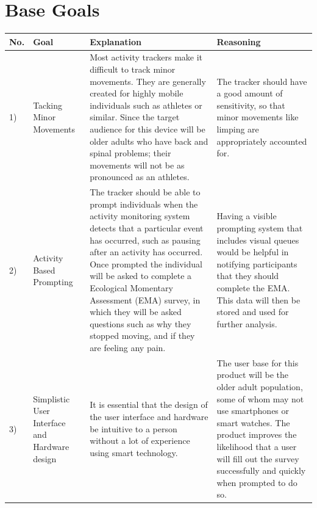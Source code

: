 \documentclass[12pt]{article}
\begin{document}
\section{Base Goals}
\begin{center}
    \begin{longtable}{| m{2em} | m{7em} | m{16em}| m{14em} | }
        \hline
        \textbf{No.} & \textbf{Goal}                                    & \textbf{Explanation} & \textbf{Reasoning}                                                                                                                                                                                                                                                                                                                                                                                                                                                                                                                                                               \\
        \hline
       1) & Tacking Minor Movements                          & Most activity trackers make it difficult to track minor movements.
        They are generally created for highly mobile individuals such as athletes or similar. Since the target audience for this device will be older adults who have back and spinal problems; their movements will not be as pronounced as an athletes. & The tracker should have a good amount of sensitivity, so that minor movements like limping are appropriately accounted for.                                                                                                                                                                                                                                                       \\
        \hline
      2)  & Activity Based Prompting                            & The tracker should be able to prompt individuals when the activity monitoring system detects that a particular event has occurred, such as pausing after an activity has occurred.  Once prompted the individual will be asked to complete a Ecological Momentary Assessment (EMA) survey, in which they will be asked questions such as why they stopped moving, and if they are feeling any pain. & Having a visible prompting system that includes visual queues would be helpful in notifying participants that they should complete the EMA. This data will then be stored and used for further analysis. \\
        \hline
       3)& Simplistic User Interface and Hardware design &  It is essential that the design of the user interface and hardware be intuitive to a person without a lot of experience using smart technology. & The user base for this product will be the older adult population, some of whom may not use smartphones or smart watches. The product improves the likelihood that a user will fill out the survey successfully and quickly when prompted to do so.                                                                                                                                                                         \\

\end{longtable}
\end{center}
\end{document}
